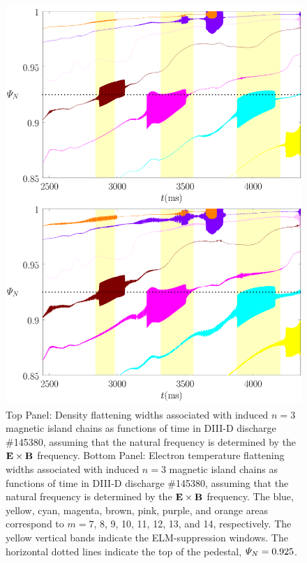 \documentclass[12pt,prb,aps]{revtex4-1}
\begin{document}
\begin{figure}
\includegraphics[height=6in]{fig10.pdf}
\caption{Top Panel: Density flattening widths associated with induced $n=3$ magnetic island  chains as functions of time
in   DIII-D discharge \#145380, assuming that the natural frequency is  determined by the ${\bf E}\times {\bf B}$
frequency.
Bottom Panel:  Electron temperature flattening widths associated with induced $n=3$ magnetic island chains as functions of time
in   DIII-D discharge \#145380, assuming that the natural frequency is determined by the ${\bf E}\times {\bf B}$
frequency. The blue, yellow, cyan, magenta, brown, pink,
purple, and orange  areas correspond to $m=7$, 8, 9, 10, 11, 12, 13, and 14, respectively. The yellow vertical bands indicate the ELM-suppression windows. 
The horizontal dotted lines indicate the top of the pedestal, ${\mit\Psi}_N=0.925$.} \label{fig10}
\end{figure}
\end{document}
